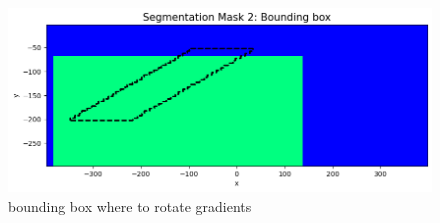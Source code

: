 \begin{figure}[htb]
    \vspace{-0.1cm}
    \begin{center}
    \includegraphics[width=\columnwidth]{figures/geosegments_dip_mod_bbox.png}
    \end{center}
    \vspace{-0.5cm}
\caption{
    bounding box where to rotate gradients
}
\label{fig:boundbox}
\vspace{-0.1cm}
\end{figure}

